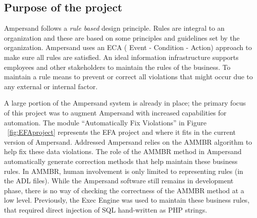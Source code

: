 %

\subsection{Purpose of the project}

Ampersand follows a \emph{rule based} design principle. Rules are integral to an organization
and these are based on some principles and guidelines set by the organization.
Ampersand uses an ECA ( Event - Condition - Action) approach to make sure all rules are satisfied. An ideal information infrastructure supports employees and other stakeholders to maintain the rules of the business. To maintain a rule means to prevent or correct all violations that might occur due to any external or internal factor.
 
 A large portion of the Ampersand system is already in place; the primary focus of this project was to
augment Ampersand with increased capabilities for automation. The module ``Automatically Fix Violations'' in Figure ~\ref{fig:EFAproject} represents the EFA project and where it fits in the current version of Ampersand.
  {Addressed}
Ampersand relies on the AMMBR \citep{Ampersand} algorithm to help fix these data violations. 
The role 
of the AMMBR method in Ampersand automatically generate correction methods that 
help maintain these business rules. In AMMBR, human involvement is only limited 
to representing rules (in the ADL files). While the Ampersand software still 
remains in development phase, there is no way of checking the correctness of 
the AMMBR method at a low level. Previously, the Exec Engine was used to 
maintain these business rules, that required direct injection of SQL 
hand-written as PHP strings. 
 
